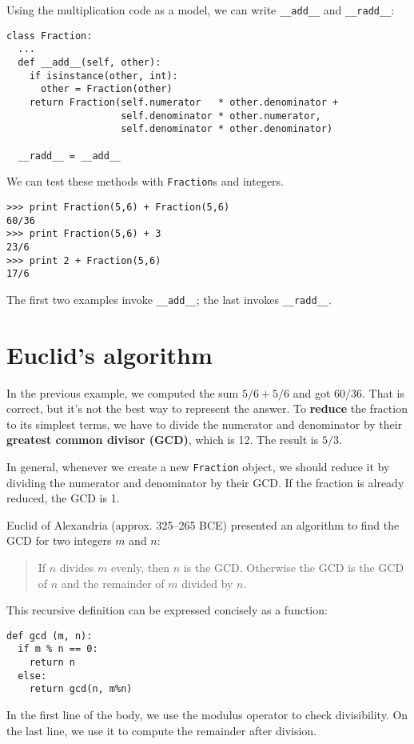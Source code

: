 Using the multiplication code as a model, we can write
{\tt \_\_add\_\_} and {\tt \_\_radd\_\_}:

\beforeverb
\begin{verbatim}
class Fraction:
  ...
  def __add__(self, other):
    if isinstance(other, int):
      other = Fraction(other)
    return Fraction(self.numerator   * other.denominator +
                    self.denominator * other.numerator,
                    self.denominator * other.denominator)

  __radd__ = __add__
\end{verbatim}
\afterverb
%
We can test these methods with {\tt Fraction}s and integers.

\beforeverb
\begin{verbatim}
>>> print Fraction(5,6) + Fraction(5,6)
60/36
>>> print Fraction(5,6) + 3
23/6
>>> print 2 + Fraction(5,6)
17/6
\end{verbatim}
\afterverb
%
The first two examples invoke {\tt \_\_add\_\_}; the last
invokes {\tt \_\_radd\_\_}.


\section{Euclid's algorithm}

In the previous example, we computed the sum $5/6 + 5/6$ and got
$60/36$.  That is correct, but it's not the best way to represent the
answer.  To {\bf reduce} the fraction to its simplest terms, we have
to divide the numerator and denominator by their {\bf greatest common
divisor (GCD)}, which is 12.  The result is $5/3$.

In general, whenever we create a new {\tt Fraction} object, we should
reduce it by dividing the numerator and denominator by their GCD.  If
the fraction is already reduced, the GCD is 1.

Euclid of Alexandria (approx. 325--265 BCE) presented an algorithm
to find the GCD for two integers $m$ and $n$:

\begin{quote}
If $n$ divides $m$ evenly, then $n$ is the GCD.  Otherwise
the GCD is the GCD of $n$ and the remainder of $m$ divided by $n$.
\end{quote}

This recursive definition can be expressed concisely as a function:

\beforeverb
\begin{verbatim}
def gcd (m, n):
  if m % n == 0:
    return n
  else:
    return gcd(n, m%n)
\end{verbatim}
\afterverb
%
In the first line of the body, we use the modulus operator to
check divisibility.  On the last line, we use it to compute
the remainder after division.

